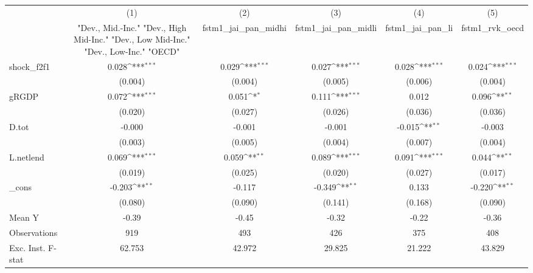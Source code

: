 {
\def\sym#1{\ifmmode^{#1}\else\(^{#1}\)\fi}
\begin{tabular}{l*{5}{c}}
\toprule
            &\multicolumn{1}{c}{(1)}&\multicolumn{1}{c}{(2)}&\multicolumn{1}{c}{(3)}&\multicolumn{1}{c}{(4)}&\multicolumn{1}{c}{(5)}\\
            &\multicolumn{1}{c}{ "Dev., Mid.-Inc." "Dev., High Mid-Inc." "Dev., Low Mid-Inc." "Dev., Low-Inc." "OECD" }&\multicolumn{1}{c}{fstm1\_jai\_pan\_midhi}&\multicolumn{1}{c}{fstm1\_jai\_pan\_midli}&\multicolumn{1}{c}{fstm1\_jai\_pan\_li}&\multicolumn{1}{c}{fstm1\_rvk\_oecd}\\
\midrule
shock\_f2f1  &       0.028\sym{***}&       0.029\sym{***}&       0.027\sym{***}&       0.028\sym{***}&       0.024\sym{***}\\
            &     (0.004)         &     (0.004)         &     (0.005)         &     (0.006)         &     (0.004)         \\
\addlinespace
gRGDP       &       0.072\sym{***}&       0.051\sym{*}  &       0.111\sym{***}&       0.012         &       0.096\sym{**} \\
            &     (0.020)         &     (0.027)         &     (0.026)         &     (0.036)         &     (0.036)         \\
\addlinespace
D.tot       &      -0.000         &      -0.001         &      -0.001         &      -0.015\sym{**} &      -0.003         \\
            &     (0.003)         &     (0.005)         &     (0.004)         &     (0.007)         &     (0.004)         \\
\addlinespace
L.netlend   &       0.069\sym{***}&       0.059\sym{**} &       0.089\sym{***}&       0.091\sym{***}&       0.044\sym{**} \\
            &     (0.019)         &     (0.025)         &     (0.020)         &     (0.027)         &     (0.017)         \\
\addlinespace
\_cons      &      -0.203\sym{**} &      -0.117         &      -0.349\sym{**} &       0.133         &      -0.220\sym{**} \\
            &     (0.080)         &     (0.090)         &     (0.141)         &     (0.168)         &     (0.090)         \\
\midrule
Mean Y      &       -0.39         &       -0.45         &       -0.32         &       -0.22         &       -0.36         \\
Observations&         919         &         493         &         426         &         375         &         408         \\
Exc. Inst. F-stat&      62.753         &      42.972         &      29.825         &      21.222         &      43.829         \\
\bottomrule
\end{tabular}
}

